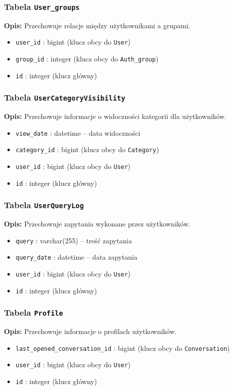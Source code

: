 \documentclass[12pt,a4paper,oneside]{article}
\theoremstyle{definition}
\numberwithin{equation}{section}
\begin{document}
\subsubsection*{Tabela \texttt{User\string_groups}}
\textbf{Opis:} Przechowuje relacje między użytkownikami a grupami.
\begin{itemize}
    \item \texttt{user\string_id} : bigint (klucz obcy do \texttt{User})
    \item \texttt{group\string_id} : integer (klucz obcy do \texttt{Auth\string_group})
    \item \texttt{id} : integer (klucz główny)
\end{itemize}

\subsubsection*{Tabela \texttt{UserCategoryVisibility}}
\textbf{Opis:} Przechowuje informacje o widoczności kategorii dla użytkowników.
\begin{itemize}
    \item \texttt{view\string_date} : datetime – data widoczności
    \item \texttt{category\string_id} : bigint (klucz obcy do \texttt{Category})
    \item \texttt{user\string_id} : bigint (klucz obcy do \texttt{User})
    \item \texttt{id} : integer (klucz główny)
\end{itemize}

\subsubsection*{Tabela \texttt{UserQueryLog}}
\textbf{Opis:} Przechowuje zapytania wykonane przez użytkowników.
\begin{itemize}
    \item \texttt{query} : varchar(255) – treść zapytania
    \item \texttt{query\string_date} : datetime – data zapytania
    \item \texttt{user\string_id} : bigint (klucz obcy do \texttt{User})
    \item \texttt{id} : integer (klucz główny)
\end{itemize}

\subsubsection*{Tabela \texttt{Profile}}
\textbf{Opis:} Przechowuje informacje o profilach użytkowników.
\begin{itemize}
    \item \texttt{last\string_opened\string_conversation\string_id} : bigint (klucz obcy do \texttt{Conversation})
    \item \texttt{user\string_id} : bigint (klucz obcy do \texttt{User})
    \item \texttt{id} : integer (klucz główny)
\end{itemize}
\end{document}
